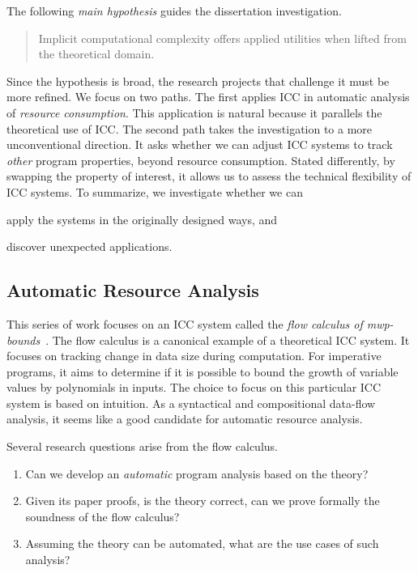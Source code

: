 The following \emph{main hypothesis} guides the dissertation investigation.
\begin{quote}
\noindent Implicit computational complexity offers applied utilities when lifted
from the theoretical domain.
\end{quote}
Since the hypothesis is broad, the research projects that challenge it must be
more refined. We focus on two paths. The first applies ICC in automatic analysis
of \emph{resource consumption}. This application is natural because it parallels
the theoretical use of ICC. The second path takes the investigation to a more
unconventional direction. It asks whether we can adjust ICC systems to track
\emph{other} program properties, beyond resource consumption. Stated
differently, by swapping the property of interest, it allows us to assess the
technical flexibility of ICC systems. To summarize, we investigate whether we
can \begin{enumerate*}[label=(\roman*)]
\item apply the systems in the originally designed ways, and
\item discover unexpected applications.
\end{enumerate*}

\subsection{Automatic Resource Analysis}
\label{subsec:aicc-automatic-resource-analysis}

This series of work focuses on an ICC system called the \emph{flow calculus of
mwp-bounds}~\cite{jones2009}. The flow calculus is a
canonical example of a theoretical ICC system. It focuses on tracking change in
data size during computation. For imperative programs, it aims to determine if it is possible to bound the growth of
variable values by polynomials in inputs. The choice to focus on this particular
ICC system is based on intuition. As a syntactical and compositional data-flow
analysis, it {seems like} a good candidate for automatic resource analysis.

Several research questions arise from the flow calculus.

\begin{enumerate}[label={(RQ\arabic*)},leftmargin=*,labelindent=1em]
\item Can we develop an \emph{automatic} program analysis based on the theory?
\item Given its paper proofs, is the theory correct, \ie can we prove formally
the soundness of the flow calculus?
\item Assuming the theory can be automated, what are the use cases of such
analysis?
\end{enumerate}

